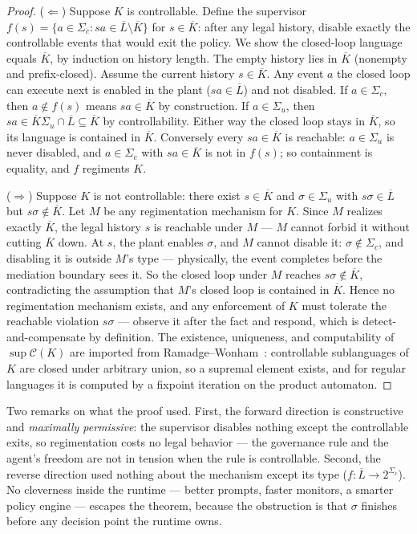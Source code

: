 \documentclass[11pt,a4paper]{article}  \usepackage{mdframed} \usepackage{graphicx}
\begin{document}
\begin{proof} ($\Leftarrow$) Suppose $K$ is controllable. Define the supervisor $f(s)=\{a\in\Sigma_c :
sa\in\overline{L}\setminus\overline{K}\}$ for $s\in\overline{K}$: after any legal history, disable exactly the controllable
events that would exit the policy. We show the closed-loop language equals $\overline{K}$, by induction on history length.
The empty history lies in $\overline{K}$ (nonempty and prefix-closed). Assume the current history $s\in\overline{K}$. Any
event $a$ the closed loop can execute next is enabled in the plant ($sa\in\overline{L}$) and not disabled. If $a\in\Sigma_c$,
then $a\notin f(s)$ means $sa\in\overline{K}$ by construction. If $a\in\Sigma_u$, then
$sa\in\overline{K}\Sigma_u\cap\overline{L}\subseteq\overline{K}$ by controllability. Either way the closed loop stays in
$\overline{K}$, so its language is contained in $\overline{K}$. Conversely every $sa\in\overline{K}$ is reachable:
$a\in\Sigma_u$ is never disabled, and $a\in\Sigma_c$ with $sa\in\overline{K}$ is not in $f(s)$; so containment is equality,
and $f$ regiments $K$.

($\Rightarrow$) Suppose $K$ is not controllable: there exist $s\in\overline{K}$ and $\sigma\in\Sigma_u$ with
$s\sigma\in\overline{L}$ but $s\sigma\notin\overline{K}$. Let $M$ be any regimentation mechanism for $K$. Since $M$ realizes
exactly $\overline{K}$, the legal history $s$ is reachable under $M$ --- $M$ cannot forbid it without cutting $\overline{K}$
down. At $s$, the plant enables $\sigma$, and $M$ cannot disable it: $\sigma\notin\Sigma_c$, and disabling it is outside
$M$'s type --- physically, the event completes before the mediation boundary sees it. So the closed loop under $M$ reaches
$s\sigma\notin\overline{K}$, contradicting the assumption that $M$'s closed loop is contained in $\overline{K}$. Hence no
regimentation mechanism exists, and any enforcement of $K$ must tolerate the reachable violation $s\sigma$ --- observe it
after the fact and respond, which is detect-and-compensate by definition. The existence, uniqueness, and computability of
$\sup\mathcal{C}(K)$ are imported from Ramadge--Wonham~\cite{rw87}: controllable sublanguages of $K$ are closed under
arbitrary union, so a supremal element exists, and for regular languages it is computed by a fixpoint iteration on the
product automaton. \end{proof}

Two remarks on what the proof used. First, the forward direction is constructive and \emph{maximally permissive}: the
supervisor disables nothing except the controllable exits, so regimentation costs no legal behavior --- the governance rule
and the agent's freedom are not in tension when the rule is controllable. Second, the reverse direction used nothing about
the mechanism except its type ($f:\overline{L}\to2^{\Sigma_c}$). No cleverness inside the runtime --- better prompts, faster
monitors, a smarter policy engine --- escapes the theorem, because the obstruction is that $\sigma$ finishes before any
decision point the runtime owns.
\end{document}
